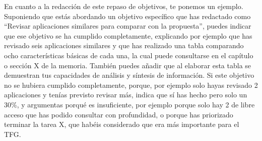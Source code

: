  En cuanto a la redacción de este repaso de objetivos, te ponemos un ejemplo. Suponiendo que estás abordando un objetivo específico que has redactado como ``Revisar aplicaciones similares para comparar con la propuesta'', puedes indicar que ese objetivo se ha cumplido completamente, explicando por ejemplo que has revisado seis aplicaciones similares y que has realizado una tabla comparando ocho características básicas de cada una, la cual puede consultarse en el capítulo o sección X de la memoria. También puedes añadir que al elaborar esta tabla se demuestran tus capacidades de análisis y síntesis de información. Si este objetivo no se hubiera cumplido completamente, porque, por ejemplo solo hayas revisado 2 aplicaciones y tenías previsto revisar más, indica que sí has hecho pero solo un 30\%, y argumentas porqué es insuficiente, por ejemplo porque solo hay 2 de libre acceso que has podido consultar con profundidad, o porque has priorizado terminar la tarea X, que habéis considerado que era más importante para el TFG. 

 
